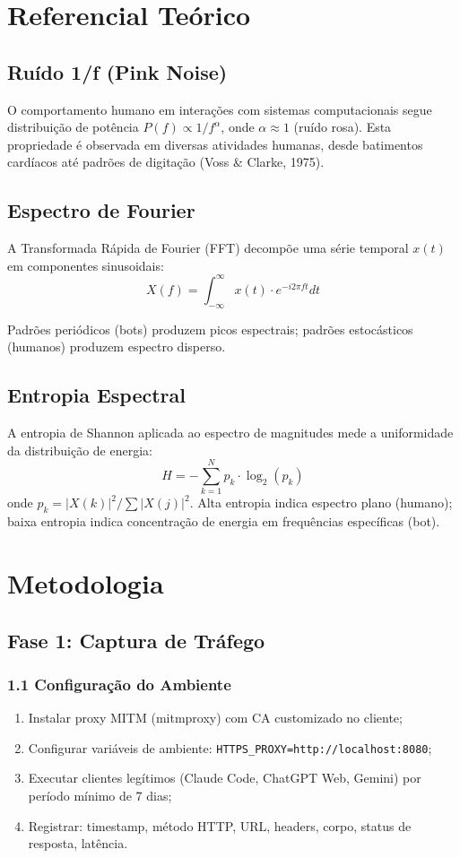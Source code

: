 \documentclass[12pt,openright,oneside,a4paper]{abntex2}
\begin{document}
\chapter{Referencial Teórico}

\section{Ruído 1/f (Pink Noise)}

O comportamento humano em interações com sistemas computacionais segue distribuição de potência $P(f) \propto 1/f^{\alpha}$, onde $\alpha \approx 1$ (ruído rosa). Esta propriedade é observada em diversas atividades humanas, desde batimentos cardíacos até padrões de digitação (Voss \& Clarke, 1975).

\section{Espectro de Fourier}

A Transformada Rápida de Fourier (FFT) decompõe uma série temporal $x(t)$ em componentes sinusoidais:
$$X(f) = \int_{-\infty}^{\infty} x(t) \cdot e^{-i2\pi ft} dt$$

Padrões periódicos (bots) produzem picos espectrais; padrões estocásticos (humanos) produzem espectro disperso.

\section{Entropia Espectral}

A entropia de Shannon aplicada ao espectro de magnitudes mede a uniformidade da distribuição de energia:
$$H = -\sum_{k=1}^{N} p_k \cdot \log_2(p_k)$$
onde $p_k = |X(k)|^2 / \sum |X(j)|^2$. Alta entropia indica espectro plano (humano); baixa entropia indica concentração de energia em frequências específicas (bot).

\chapter{Metodologia}

\section{Fase 1: Captura de Tráfego}

\subsection{1.1 Configuração do Ambiente}
\begin{enumerate}
    \item Instalar proxy MITM (mitmproxy) com CA customizado no cliente;
    \item Configurar variáveis de ambiente: \texttt{HTTPS\_PROXY=http://localhost:8080};
    \item Executar clientes legítimos (Claude Code, ChatGPT Web, Gemini) por período mínimo de 7 dias;
    \item Registrar: timestamp, método HTTP, URL, headers, corpo, status de resposta, latência.
\end{enumerate}
\end{document}

